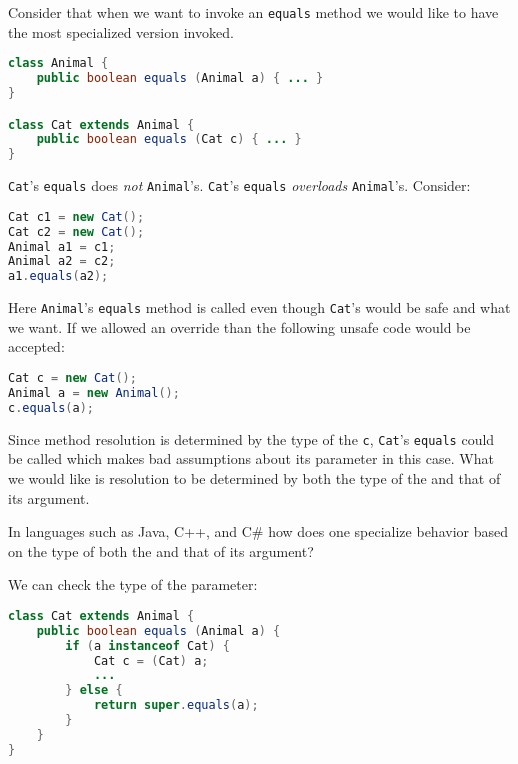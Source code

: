 \documentclass{article}
\begin{document}
\begin{example}[Equals]
Consider that when we want to invoke an \texttt{equals} method we would like to have the most specialized version invoked.
\begin{lstlisting}[language=Java, escapechar=|]
class Animal {
    public boolean equals (Animal a) { ... }
}

class Cat extends Animal {
    public boolean equals (Cat c) { ... }
}
\end{lstlisting}
\texttt{Cat}'s \texttt{equals} does \textit{not} \override{} \texttt{Animal}'s. \texttt{Cat}'s \texttt{equals} \textit{overloads} \texttt{Animal}'s.
Consider:
\begin{lstlisting}[language=Java, escapechar=|]
Cat c1 = new Cat();
Cat c2 = new Cat();
Animal a1 = c1;
Animal a2 = c2;
a1.equals(a2);
\end{lstlisting}
Here \texttt{Animal}'s \texttt{equals} method is called even though \texttt{Cat}'s would be safe and what we want.
If we allowed an override than the following unsafe code would be accepted:
\begin{lstlisting}[language=Java, escapechar=|]
Cat c = new Cat();
Animal a = new Animal();
c.equals(a);
\end{lstlisting}
Since method resolution is determined by the \dynamic{} type of the \receiver{} \texttt{c}, \texttt{Cat}'s \texttt{equals} could be called which makes bad assumptions about its parameter in this case. What we would like is resolution to be determined by both the \dynamic{} type of the \receiver{} and that of its argument.
\end{example}

In languages such as Java, C++, and C\# how does one specialize behavior based on the \dynamic{} type of both the \receiver{} and that of its argument?

\begin{example}
We can check the type of the parameter:
\begin{lstlisting}[language=Java, escapechar=|]
class Cat extends Animal {
    public boolean equals (Animal a) {
        if (a instanceof Cat) {
            Cat c = (Cat) a;
            ...
        } else {
            return super.equals(a);
        }
    }
}
\end{lstlisting}
\end{example}
\end{document}
